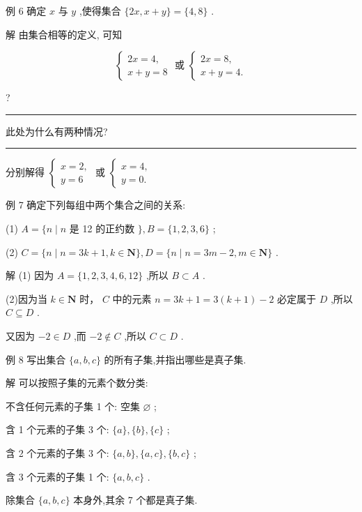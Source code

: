\documentclass[10pt]{article}
\newcommand{\HRule}{\begin{center}\rule{0.9\linewidth}{0.2mm}\end{center}}
\begin{document}
例 6 确定 \(x\) 与 \(y\) ,使得集合 \(\{ {2x},x + y\}  = \{ 4,8\}\) .

解 由集合相等的定义, 可知

\[
\left\{  {\begin{array}{l} {2x} = 4, \\  x + y = 8 \end{array}\text{ 或 }\left\{  \begin{array}{l} {2x} = 8, \\  x + y = 4. \end{array}\right. }\right.
\]

?

\HRule

此处为什么有两种情况?

\HRule

分别解得 \(\left\{  \begin{array}{l} x = 2, \\  y = 6 \end{array}\right.\) 或 \(\left\{  \begin{array}{l} x = 4, \\  y = 0. \end{array}\right.\)

例 7 确定下列每组中两个集合之间的关系:

(1) \(A = \{ n \mid  n\) 是 12 的正约数 \(\} ,B = \{ 1,2,3,6\}\) ;

(2) \(C = \{ n \mid  n = {{3k} + 1},k \in  \mathbf{N}\} ,D = \{ n \mid  n = {{3m} - 2},m \in  \mathbf{N}\}\) .

解 (1) 因为 \(A = \{ 1,2,3,4,6,{12}\}\) ,所以 \(B \subset  A\) .

(2)因为当 \(k \in  \mathbf{N}\) 时， \(C\) 中的元素 \(n = {{3k} + 1} = 3\left( {k + 1}\right)  - 2\) 必定属于 \(D\) ,所以 \(C \subseteq  D\) .

又因为 \(- 2 \in  D\) ,而 \(- 2 \notin  C\) ,所以 \(C \subset  D\) .

例 8 写出集合 \(\{ a,b,c\}\) 的所有子集,并指出哪些是真子集.

解 可以按照子集的元素个数分类:

不含任何元素的子集 1 个: 空集 \(\varnothing\) ;

含 1 个元素的子集 3 个: \(\{ a\} ,\{ b\} ,\{ c\}\) ;

含 2 个元素的子集 3 个: \(\{ a,b\} ,\{ a,c\} ,\{ b,c\}\) ;

含 3 个元素的子集 1 个: \(\{ a,b,c\}\) .

除集合 \(\{ a,b,c\}\) 本身外,其余 7 个都是真子集.
\end{document}
